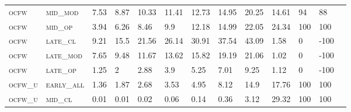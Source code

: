 \begin{landscape}
\begin{table}[!htbp]
\begin{tabular}{@{}lllllllllllll@{}}
\footnotesize \textsc{ocfw}        & \footnotesize \textsc{mid\_mod  }                & \footnotesize 7.53            & \footnotesize 8.87            & \footnotesize 10.33            & \footnotesize 11.41            & \footnotesize 12.73            & \footnotesize 14.95            & \footnotesize 20.25      & \footnotesize 14.61    & \footnotesize 94     & \footnotesize 88       \\
\footnotesize \textsc{ocfw}        & \footnotesize \textsc{mid\_op   }                & \footnotesize 3.94            & \footnotesize 6.26            & \footnotesize 8.46             & \footnotesize 9.9              & \footnotesize 12.18            & \footnotesize 14.99            & \footnotesize 22.05      & \footnotesize 24.34    & \footnotesize 100    & \footnotesize 100      \\
\footnotesize \textsc{ocfw}        & \footnotesize \textsc{late\_cl  }                & \footnotesize 9.21            & \footnotesize 15.5            & \footnotesize 21.56            & \footnotesize 26.14            & \footnotesize 30.91            & \footnotesize 37.54            & \footnotesize 43.09      & \footnotesize 1.58     & \footnotesize 0      & \footnotesize -100     \\
\footnotesize \textsc{ocfw}        & \footnotesize \textsc{late\_mod }                & \footnotesize 7.65            & \footnotesize 9.48            & \footnotesize 11.67            & \footnotesize 13.62            & \footnotesize 15.82            & \footnotesize 19.19            & \footnotesize 21.06      & \footnotesize 1.02     & \footnotesize 0      & \footnotesize -100     \\
\footnotesize \textsc{ocfw}        & \footnotesize \textsc{late\_op  }                & \footnotesize 1.25            & \footnotesize 2               & \footnotesize 2.88             & \footnotesize 3.9              & \footnotesize 5.25             & \footnotesize 7.01             & \footnotesize 9.25       & \footnotesize 1.12     & \footnotesize 0      & \footnotesize -100     \\
\footnotesize \textsc{ocfw\_u}     & \footnotesize \textsc{early\_all}                & \footnotesize 1.36            & \footnotesize 1.87            & \footnotesize 2.68             & \footnotesize 3.53             & \footnotesize 4.95             & \footnotesize 8.12             & \footnotesize 14.9       & \footnotesize 17.76    & \footnotesize 100    & \footnotesize 100      \\
\footnotesize \textsc{ocfw\_u}     & \footnotesize \textsc{mid\_cl   }                & \footnotesize 0.01            & \footnotesize 0.01            & \footnotesize 0.02             & \footnotesize 0.06             & \footnotesize 0.14             & \footnotesize 0.36             & \footnotesize 3.12       & \footnotesize 29.32    & \footnotesize 100    & \footnotesize 100      \\

\end{tabular}
\end{table}
\end{landscape}
